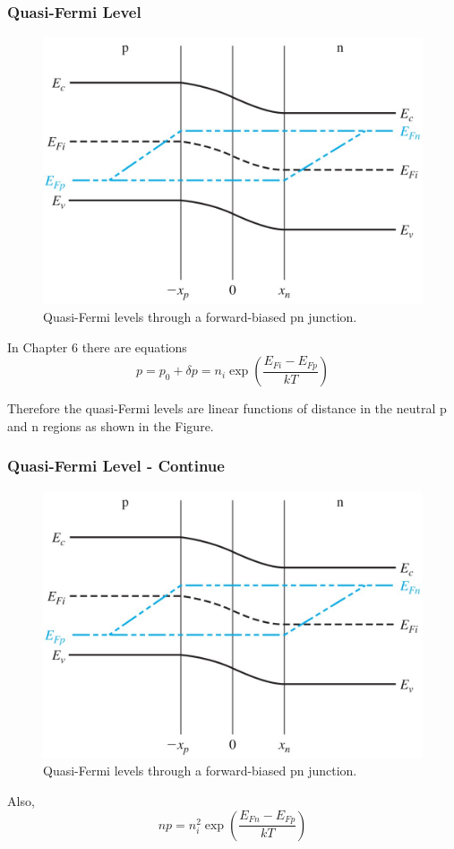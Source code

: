 \documentclass{beamer}
\begin{document}
    \begin{frame} \frametitle{Quasi-Fermi Level}
        \begin{figure}[H]
            \centering
            \includegraphics[width=0.5\linewidth]{Quasi-fermi-level.jpg}
            \caption{Quasi-Fermi levels through a forward-biased pn junction.}
            \label{fig:Quasi-fermi-level-1.jpg}
        \end{figure}
        \par In Chapter 6 there are equations
        \begin{equation*}
            p = p_0 + \delta p = n_i \exp\left( \frac{E_{Fi} - E_{Fp} }{kT}  \right)
        \end{equation*}
        \par Therefore the quasi-Fermi levels are linear functions of distance in the neutral p and n regions as shown in the Figure.
    \end{frame}
    \begin{frame} \frametitle{Quasi-Fermi Level - Continue}
        \begin{figure}[H]
            \centering
            \includegraphics[width=0.5\linewidth]{Quasi-fermi-level.jpg}
            \caption{Quasi-Fermi levels through a forward-biased pn junction.}
            \label{fig:Quasi-fermi-level-2.jpg}
        \end{figure}
        \par Also, 
        \begin{equation*}
            np = n_i^2 \exp \left( \frac{E_{Fn} - E_{Fp} }{kT}  \right)
        \end{equation*}
    \end{frame}
\end{document}
